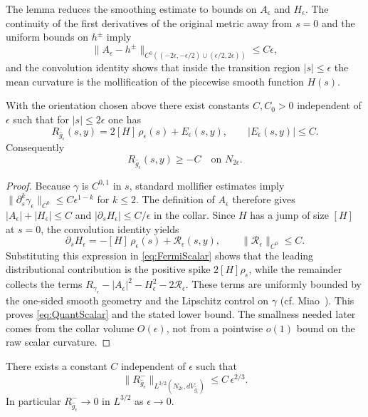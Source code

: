 The lemma reduces the smoothing estimate to bounds on $A_\epsilon$ and $H_\epsilon$.  The continuity of the first derivatives of the original metric away from $s=0$ and the uniform bounds on $h^\pm$ imply
\[
    \|A_\epsilon - h^\pm\|_{C^0((-2\epsilon,-\epsilon/2)\cup(\epsilon/2,2\epsilon))} \le C \epsilon,
\]
and the convolution identity shows that inside the transition region $|s| \le \epsilon$ the mean curvature is the mollification of the piecewise smooth function $H(s)$.

\begin{proposition}\label{prop:CollarBound}
With the orientation chosen above there exist constants $C,C_0>0$ independent of $\epsilon$ such that for $|s|\le 2\epsilon$ one has
\begin{equation}\label{eq:QuantScalar}
    R_{\hat{g}_\epsilon}(s,y) = 2[H] \, \rho_\epsilon(s) + E_\epsilon(s,y), \qquad |E_\epsilon(s,y)| \le C.
\end{equation}
Consequently
\begin{equation}\label{eq:PointwiseLower}
    R_{\hat{g}_\epsilon}(s,y) \ge - C \quad \text{on } N_{2\epsilon}.
\end{equation}
\end{proposition}

\begin{proof}
Because $\gamma$ is $C^{0,1}$ in $s$, standard mollifier estimates imply $\|\partial_s^k \gamma_\epsilon\|_{C^0} \le C \epsilon^{1-k}$ for $k\le 2$.  The definition of $A_\epsilon$ therefore gives $|A_\epsilon| + |H_\epsilon| \le C$ and $|\partial_s H_\epsilon| \le C/\epsilon$ in the collar.  Since $H$ has a jump of size $[H]$ at $s=0$, the convolution identity yields
\[
    \partial_s H_\epsilon = -[H] \, \rho_\epsilon(s) + \mathcal{R}_\epsilon(s,y), \qquad \|\mathcal{R}_\epsilon\|_{C^0} \le C.
\]
Substituting this expression in \eqref{eq:FermiScalar} shows that the leading distributional contribution is the positive spike $2[H]\rho_\epsilon$, while the remainder collects the terms $R_{\gamma_\epsilon} - |A_\epsilon|^2 - H_\epsilon^2 - 2\mathcal{R}_\epsilon$. These terms are uniformly bounded by the one-sided smooth geometry and the Lipschitz control on $\gamma$ (cf. Miao~\cite[Prop.~3.1]{miao2002}). This proves \eqref{eq:QuantScalar} and the stated lower bound. The smallness needed later comes from the collar volume \(O(\epsilon)\), not from a pointwise \(o(1)\) bound on the raw scalar curvature.
\end{proof}

\begin{corollary}\label{cor:L32}
There exists a constant $C$ independent of $\epsilon$ such that
\begin{equation}
    \|R_{\hat{g}_\epsilon}^-\|_{L^{3/2}(N_{2\epsilon}, dV_{\hat{g}_\epsilon})} \le C \, \epsilon^{2/3}.
\end{equation}
In particular $R_{\hat{g}_\epsilon}^- \to 0$ in $L^{3/2}$ as $\epsilon \to 0$.
\end{corollary}

